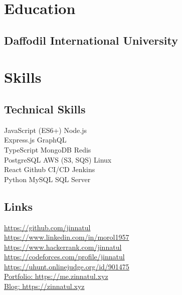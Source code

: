\documentclass[]{deedy-resume-openfont}
\begin{document}
\begin{minipage}[t]{0.34\textwidth} 


\section{Education} 

\subsection{Daffodil International University}
\sectionsep


\section{Skills}
\subsection{Technical Skills}
\textbullet{} JavaScript (ES6+) \textbullet{}   Node.js \\
\textbullet{} Express.js \textbullet{} GraphQL \\
\textbullet{} TypeScript \textbullet{} MongoDB \textbullet{} Redis \\
\textbullet{} PostgreSQL \textbullet{} AWS (S3, SQS) \textbullet{} Linux \\
\textbullet{} React  \textbullet{} Github CI/CD \textbullet{} Jenkins \\
\textbullet{} Python
\textbullet{} MySQL \textbullet{} SQL Server\\
\sectionsep


\subsection{Links} 
\textbullet{} \href{https://github.com/jinnatul}{https://github.com/jinnatul} \\
\textbullet{} \href{https://www.linkedin.com/in/morol1957}{https://www.linkedin.com/in/morol1957} \\
\textbullet{} \href{https://www.hackerrank.com/jinnatul}{https://www.hackerrank.com/jinnatul} \\
\textbullet{} \href{https://codeforces.com/profile/jinnatul}{https://codeforces.com/profile/jinnatul} \\
\textbullet{} \href{https://uhunt.onlinejudge.org/id/901475}{https://uhunt.onlinejudge.org/id/901475} \\
\textbullet{} \href{https://me.zinnatul.xyz}{Portfolio: https://me.zinnatul.xyz} \\
\textbullet{} \href{https://zinnatul.xyz}{Blog: https://zinnatul.xyz} \\
\sectionsep


\end{minipage}
\end{document}
